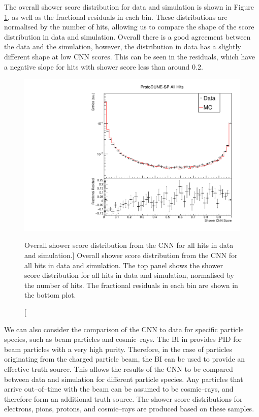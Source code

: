 The overall shower score distribution for data and simulation is shown in 
Figure \ref{fig:cnn_overall_score}, as well as the fractional residuals in 
each bin. These distributions are normalised by the number of hits, allowing us
to compare the shape of the score distribution in data and simulation.  
Overall there is a good agreement between the data and the simulation, 
however, the distribution in data has a slightly different shape at low CNN
scores. This can be seen in the residuals, which have a negative slope for 
hits with shower score less than around 0.2.
\begin{figure}
	\centering
	\includegraphics[width=\textwidth]{figures/hit_cnn_all.pdf}
	\caption
	[Overall shower score distribution from the CNN for all hits in data and simulation.]
	{Overall shower score distribution from the CNN for all hits in data and
	simulation. The top panel shows the shower score distribution for all hits in
	data and simulation, normalised by the number of hits. The fractional 
	residuals in each bin are shown in the bottom plot.}
	\label{fig:cnn_overall_score}
\end{figure}

We can also consider the comparison of the CNN to data for specific particle 
species, such as beam particles and cosmic--rays.  The BI in \protodune{} 
provides PID for beam particles with a very high purity. Therefore, in the 
case of particles originating from the charged particle beam, the BI can be 
used to provide an effective truth source. This allows the results of the CNN 
to be compared between data and simulation for different particle species. Any 
particles that arrive out--of--time with the beam can be assumed to be 
cosmic--rays, and therefore form an additional truth source. The shower score 
distributions for electrons, pions, protons, and cosmic--rays are produced 
based on these samples. 

